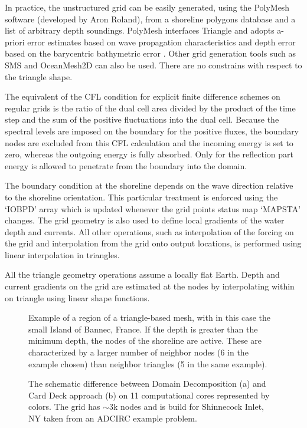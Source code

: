 In practice, the unstructured grid can be easily generated, using the PolyMesh
software (developed by Aron Roland), from a shoreline polygons database
and a list of arbitrary depth soundings. PolyMesh interfaces Triangle and adopts
a-priori error estimates based on wave propagation characteristics and depth error
based on the barycentric bathymetric error \citep[e.g.][]{art:WS96}. 
Other grid generation tools such as SMS and OceanMesh2D can also be used. There
are no constrains with respect to the triangle shape.

The equivalent of the CFL condition for explicit finite difference schemes
on regular grids is the ratio of the dual cell area divided by the product
of the time step and the sum of the positive fluctuations into the dual cell.
Because the spectral levels are imposed on the boundary
for the positive fluxes, the boundary nodes are excluded from this CFL
calculation and the incoming energy is set to zero, whereas the outgoing energy
is fully absorbed. Only for the reflection part energy is allowed to penetrate
from the boundary into the domain.

The boundary condition at the shoreline depends on the wave direction
relative to the shoreline orientation. This particular treatment is enforced
using the `{\code IOBPD}' array which is updated whenever the grid points
status map `{\code MAPSTA}' changes. The grid geometry is also used to define
local gradients of the water depth and currents. All other operations, such as
interpolation of the forcing on the grid and interpolation from the grid onto
output locations, is performed using linear interpolation in triangles.

All the triangle geometry operations assume a locally flat Earth. Depth and
current gradients on the grid are estimated at the nodes by interpolating
within on triangle using linear shape functions.

\begin{figure} \begin{center}
\caption{Example of a region of a triangle-based mesh, with in this case the
 small Island of Bannec, France. If the depth is greater than the minimum
depth, the nodes of the shoreline are active. These are characterized by a
larger number of neighbor nodes (6 in the example chosen) than neighbor
triangles (5 in the same example).}
\label{fig:triangles} \botline
\end{center}
\end{figure}


\begin{figure} \begin{center}
\caption{The schematic difference between Domain Decomposition (a) and Card Deck approach (b) on 11 computational cores represented by colors. The grid has $\sim$3k nodes  and is build for Shinnecock Inlet, NY taken from an ADCIRC example problem.}
\label{DDvsCD} \botline
\end{center}
\end{figure}

